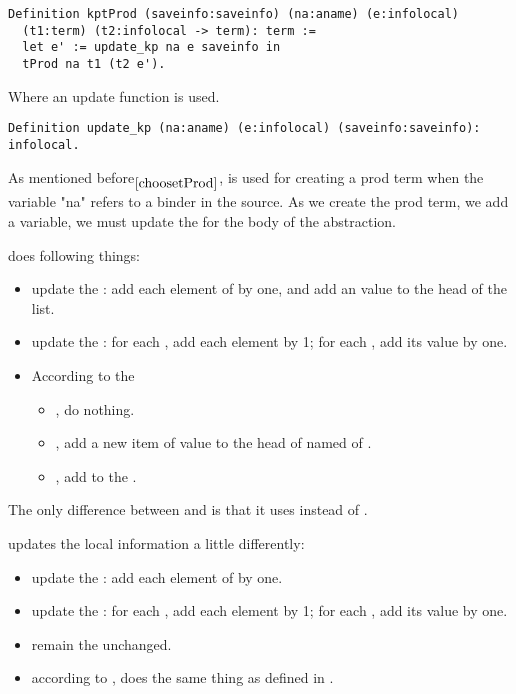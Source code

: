 \documentclass[a4paper,UKenglish,cleveref, autoref, thm-restate]{lipics-v2021}
\begin{document}
\begin{lstlisting}[language = {Coq}, basicstyle = \small]
Definition kptProd (saveinfo:saveinfo) (na:aname) (e:infolocal) 
  (t1:term) (t2:infolocal -> term): term :=
  let e' := update_kp na e saveinfo in
  tProd na t1 (t2 e').
\end{lstlisting}

Where an update function is used.

\begin{lstlisting}[language = {Coq}, basicstyle = \small]
Definition update_kp (na:aname) (e:infolocal) (saveinfo:saveinfo): infolocal.
\end{lstlisting}

As mentioned before$_{\ref{choosetProd}}$,  is used for creating a prod term when the variable "na" refers to a binder in the source. As we create the prod term, we add a variable, we must update the  for the body of the abstraction.





 does following things:
\begin{itemize}
    \item update the : add each element of  by one, and add an value  to the head of the list.
    \item update the : for each , add each element by 1; for each , add its value by one.
    \item According to the 
    \begin{itemize}
        \item {}, do nothing.
        \item {}, add a new item of value  to the head of  named  of .
        \item  {}, add  to the .
    \end{itemize}
\end{itemize}


The only difference between  and  is that it uses  instead of .

 updates the local information a little differently:
\begin{itemize}
    \item update the : add each element of  by one.
     \item update the : for each , add each element by 1; for each , add its value by one.
     \item remain the  unchanged.
     \item according to , does the same thing as defined in .
\end{itemize}
\end{document}

